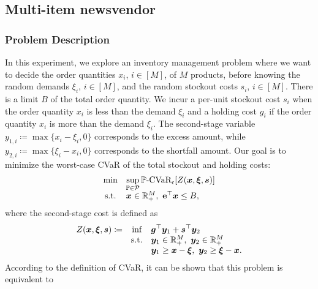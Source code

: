 \documentclass{article}
\newcommand{\st}{\textnormal{s.t.}}
\newcommand{\PP}{\mathbb{P}}
\begin{document}
\subsection{Multi-item newsvendor}

\subsubsection{Problem Description} 

In this experiment, we explore an inventory management problem where we want to decide the order quantities $x_i$, $i \in [M]$, of $M$ products, before knowing the random demands $\xi_i$, $i \in [M]$, and the random stockout costs $s_i$, $i \in [M]$. There is a limit $B$ of the total order quantity. We incur a per-unit stockout cost $s_i$ when the order quantity $x_i$ is less than the demand $\xi_i$ and a holding cost $g_i$ if the order quantity $x_i$ is more than the demand $\xi_i$. The second-stage variable $y_{1,i}\coloneqq\max\{x_i-\xi_i,0\}$ corresponds to the excess amount, while  $y_{2,i}\coloneqq\max\{\xi_i-x_i,0\}$ corresponds to the shortfall amount. 
Our goal is to minimize the worst-case CVaR of the total stockout and holding costs:
\begin{equation*}
\begin{array}{clll}
  \displaystyle \text{min} & \displaystyle \sup_{\PP\in\mathcal P} \PP\text{-CVaR}_\epsilon[Z(\bm x, \bm \xi, \bm s)] \\
  \st & \bm x \in \mathbb{R}^M_{+}, \ \mathbf{e}^\top \bm x \leq B, \\
\end{array}
\end{equation*}
where the second-stage cost is defined as
\begin{equation*}
\begin{array}{ccll}
  \displaystyle Z(\bm x, \bm \xi, \bm s) \coloneqq & \displaystyle \text{inf} & \displaystyle \bm g^\top \bm y_1  +\bm s^\top \bm y_2 \\
   & \st &\bm y_1 \in \mathbb{R}^M_{+},\ \bm y_2 \in \mathbb{R}^M_{+}\\
   & & \bm y_1 \geq \bm x - \bm \xi, \ \bm y_2 \geq \bm \xi- \bm x.
\end{array}
\end{equation*}
According to the definition of CVaR, it can be shown that this problem is equivalent to
\end{document}
